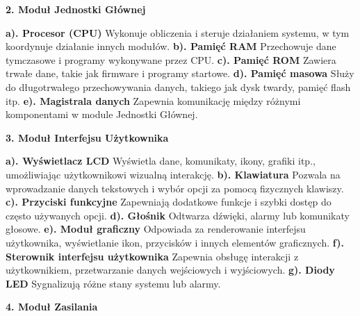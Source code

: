 \documentclass{article}
\begin{document}
\large
\begin{center}
    \textbf{2. Moduł Jednostki Głównej} 
\end{center}
\begin{flushleft}
    \textbf{a). Procesor (CPU)} Wykonuje obliczenia i steruje działaniem systemu, w tym koordynuje działanie innych modułów. \newline
    \textbf{b). Pamięć RAM} Przechowuje dane tymczasowe i programy wykonywane przez CPU. \newline
    \textbf{c). Pamięć ROM} Zawiera trwałe dane, takie jak firmware i programy startowe. \newline
    \textbf{d). Pamięć masowa} Służy do długotrwałego przechowywania danych, takiego jak dysk twardy, pamięć flash itp. \newline
    \textbf{e). Magistrala danych} Zapewnia komunikację między różnymi komponentami w module Jednostki Głównej. \newline
\end{flushleft}
\large
\begin{center}
    \textbf{3. Moduł Interfejsu Użytkownika} 
\end{center}
\begin{flushleft}
    \textbf{a). Wyświetlacz LCD} Wyświetla dane, komunikaty, ikony, grafiki itp., umożliwiając użytkownikowi wizualną interakcję. \newline
    \textbf{b). Klawiatura} Pozwala na wprowadzanie danych tekstowych i wybór opcji za pomocą fizycznych klawiszy. \newline
    \textbf{c). Przyciski funkcyjne} Zapewniają dodatkowe funkcje i szybki dostęp do często używanych opcji. \newline
    \textbf{d). Głośnik} Odtwarza dźwięki, alarmy lub komunikaty głosowe. \newline
    \textbf{e). Moduł graficzny} Odpowiada za renderowanie interfejsu użytkownika, wyświetlanie ikon, przycisków i innych elementów graficznych. \newline
    \textbf{f). Sterownik interfejsu użytkownika} Zapewnia obsługę interakcji z użytkownikiem, przetwarzanie danych wejściowych i wyjściowych. \newline
    \textbf{g). Diody LED} Sygnalizują różne stany systemu lub alarmy. \newline
\end{flushleft}
\newpage
\large
\begin{center}
    \textbf{4. Moduł Zasilania} 
\end{center}
\end{document}
